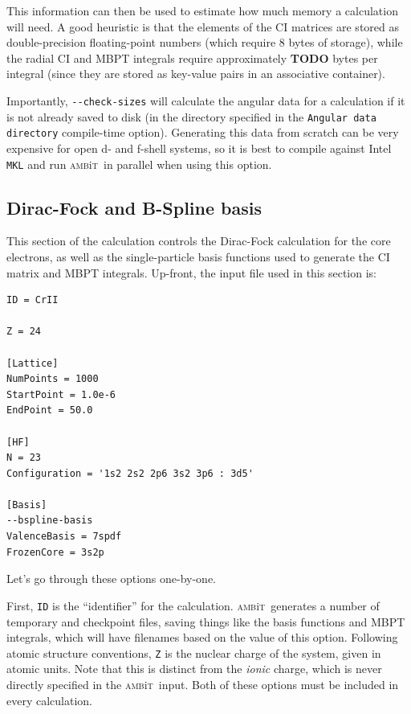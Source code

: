 \documentclass{report}
\newcommand{\ambit}{\textsc{amb}{\footnotesize i}\textsc{t}}
\begin{document}
This information can then be used to estimate how much memory a calculation will need. A good heuristic
is that the elements of the CI matrices are stored as double-precision floating-point numbers
(which require 8 bytes of storage), while the radial CI and MBPT integrals require approximately
\textbf{TODO} bytes per integral (since they are stored as key-value pairs in an associative container).

Importantly, \texttt{{-}{-}check-sizes} will calculate the angular data for a calculation if it is not
already saved to disk (in the directory specified in the \texttt{Angular data directory} compile-time
option). Generating this data from scratch can be very expensive for open d- and f-shell systems, so it
is best to compile against Intel \texttt{MKL} and run \ambit\  in parallel when using this option.

\subsection{Dirac-Fock and B-Spline basis}
\label{sec:tut_DF}

This section of the calculation controls the Dirac-Fock calculation for the core electrons, as well as
the single-particle basis functions used to generate the CI matrix and MBPT integrals. Up-front, the 
input file used in this section is:

\begin{verbatim}
ID = CrII

Z = 24

[Lattice]
NumPoints = 1000
StartPoint = 1.0e-6
EndPoint = 50.0

[HF]
N = 23
Configuration = '1s2 2s2 2p6 3s2 3p6 : 3d5'

[Basis]
--bspline-basis
ValenceBasis = 7spdf
FrozenCore = 3s2p
\end{verbatim}

Let's go through these options one-by-one. 

First, \texttt{ID} is the ``identifier'' for the calculation. \ambit\  generates a number of temporary
and checkpoint files, saving things like the basis functions and MBPT integrals, which will have
filenames based on the value of this option. Following atomic structure conventions, \texttt{Z} is the
nuclear charge of the system, given in atomic units. Note that this is distinct from the \textit{ionic}
charge, which is never directly specified in the \ambit\  input. Both of these options must be included
in every calculation.
\end{document}
